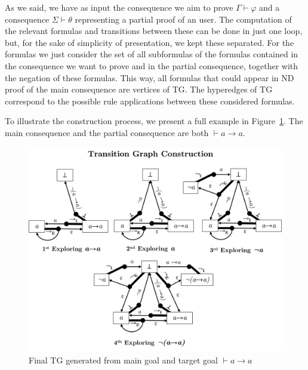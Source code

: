 As we said, we have as input the consequence we aim to prove \(\Gamma \vdash \varphi\) and a consequence \(\Sigma \vdash \theta\) representing a partial proof of an user. The computation of the relevant formulas and transitions between these can be done in just one loop, but, for the sake of simplicity of presentation, we kept these separated. For the formulas we just consider the set of all subformulas of the formulas contained in the consequence we want to prove and in the partial consequence, together with the negation of these formulas. This way, all formulas that could appear in ND proof of the main consequence are vertices of TG.
The hyperedges of TG correspond to the possible rule applications between these considered formulas.


To illustrate the construction process, we present a full example in Figure~\ref{fig:tg-final}. The main consequence and the partial consequence are both \(\vdash a \to a\).
\begin{figure}[h]
    \centering
    \includegraphics[width=0.8\linewidth]{resources/tg-final.png}
    \caption{Final TG generated from main goal and target goal \(\vdash a \to a\)}
    \label{fig:tg-final}
\end{figure}

